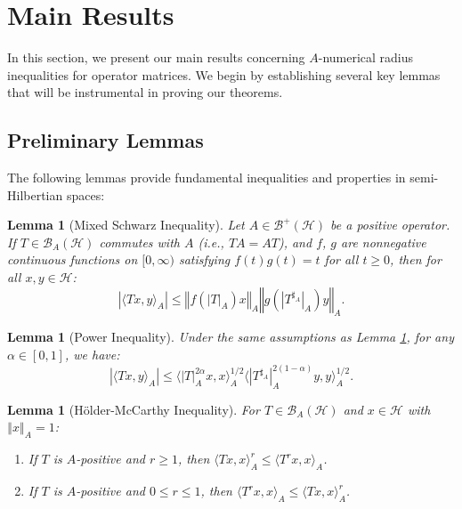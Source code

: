 \documentclass{article}
\newcommand{\norm}[1]{\left\Vert#1\right\Vert}
\newcommand{\abs}[1]{\left\vert#1\right\vert}
\newtheorem{lemma}[theorem]{Lemma}
\begin{document}
\section{Main Results}
\label{sec:main_results}

In this section, we present our main results concerning $A$-numerical radius inequalities for operator matrices. We begin by establishing several key lemmas that will be instrumental in proving our theorems.

\subsection{Preliminary Lemmas}

The following lemmas provide fundamental inequalities and properties in semi-Hilbertian spaces:

\begin{lemma}[Mixed Schwarz Inequality]
\label{lem:mixed_schwarz}
Let $A \in \mathcal{B}^+(\mathcal{H})$ be a positive operator. If $T \in \mathcal{B}_A(\mathcal{H})$ commutes with $A$ (i.e., $TA = AT$), and $f$, $g$ are nonnegative continuous functions on $[0, \infty)$ satisfying $f(t)g(t) = t$ for all $t \geq 0$, then for all $x, y \in \mathcal{H}$:
\[
\abs{\langle Tx, y \rangle_A} \leq \norm{f(|T|_A)x}_A \norm{g(|T^{\sharp_A}|_A)y}_A.
\]
\end{lemma}

\begin{lemma}[Power Inequality]
\label{lem:power_inequality}
Under the same assumptions as Lemma \ref{lem:mixed_schwarz}, for any $\alpha \in [0, 1]$, we have:
\[
\abs{\langle Tx, y \rangle_A} \leq \langle |T|_A^{2\alpha}x, x \rangle_A^{1/2} \langle |T^{\sharp_A}|_A^{2(1-\alpha)}y, y \rangle_A^{1/2}.
\]
\end{lemma}

\begin{lemma}[H\"older-McCarthy Inequality]
\label{lem:holder_mccarthy}
For $T \in \mathcal{B}_A(\mathcal{H})$ and $x \in \mathcal{H}$ with $\norm{x}_A = 1$:
\begin{enumerate}
    \item If $T$ is $A$-positive and $r \geq 1$, then $\langle Tx, x \rangle_A^r \leq \langle T^rx, x \rangle_A$.
    \item If $T$ is $A$-positive and $0 \leq r \leq 1$, then $\langle T^rx, x \rangle_A \leq \langle Tx, x \rangle_A^r$.
\end{enumerate}
\end{lemma}
\end{document}
